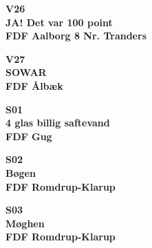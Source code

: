 \begin{center}
{\fontsize{300}{60}\selectfont\textbf{\textcolor{søblå}{V26}}\\}
{\fontsize{30}{50}\selectfont\textbf{\textcolor{søblå}{JA! Det var 100 point}}\\}
{\fontsize{20}{50}\selectfont\textbf{FDF Aalborg 8 Nr. Tranders}\\}
\end{center}
\newpage

\vspace*{2cm}
\begin{center}
{\fontsize{300}{60}\selectfont\textbf{\textcolor{søblå}{V27}}\\}
{\fontsize{30}{50}\selectfont\textbf{\textcolor{søblå}{SOWAR}}\\}
{\fontsize{20}{50}\selectfont\textbf{FDF Ålbæk}\\}
\end{center}
\newpage

\vspace*{2cm}
\begin{center}
{\fontsize{300}{60}\selectfont\textbf{\textcolor{flammefarvet}{S01}}\\}
{\fontsize{30}{50}\selectfont\textbf{\textcolor{flammefarvet}{4 glas billig saftevand}}\\}
{\fontsize{20}{50}\selectfont\textbf{FDF Gug}\\}
\end{center}
\newpage

\vspace*{2cm}
\begin{center}
{\fontsize{300}{60}\selectfont\textbf{\textcolor{flammefarvet}{S02}}\\}
{\fontsize{30}{50}\selectfont\textbf{\textcolor{flammefarvet}{Bøgen}}\\}
{\fontsize{20}{50}\selectfont\textbf{FDF Romdrup-Klarup}\\}
\end{center}
\newpage

\vspace*{2cm}
\begin{center}
{\fontsize{300}{60}\selectfont\textbf{\textcolor{flammefarvet}{S03}}\\}
{\fontsize{30}{50}\selectfont\textbf{\textcolor{flammefarvet}{Møghen}}\\}
{\fontsize{20}{50}\selectfont\textbf{FDF Romdrup-Klarup}\\}
\end{center}
\newpage

\vspace*{2cm}
